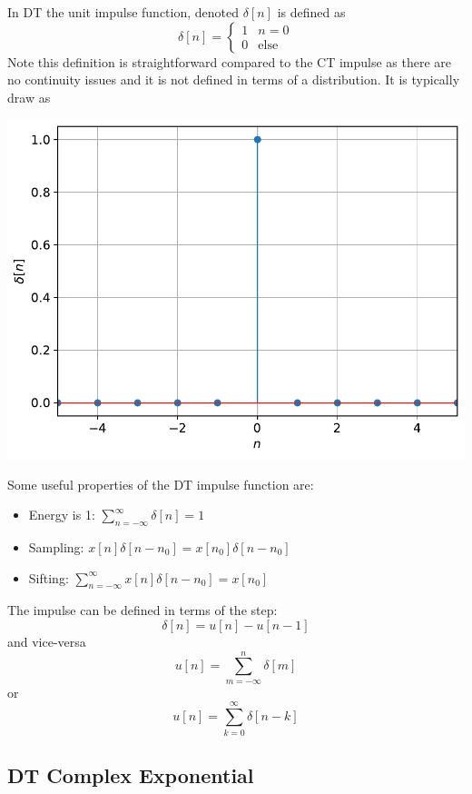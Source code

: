 In DT the unit impulse function, denoted $\delta[n]$ is defined as
\[
\delta[n] = \left\{
\begin{array}{ll}
  1 & n = 0\\
  0 & \text{else}
\end{array}
\right.
\]
Note this definition is straightforward compared to the CT impulse as there are no continuity issues and it is not defined in terms of a distribution. It is typically draw as
\begin{center}
  \includegraphics[scale=0.5]{graphics/dtdelta.pdf}
\end{center}

Some useful properties of the DT impulse function are:

\begin{itemize}
\item Energy is 1: $\sum\limits_{n=-\infty}^{\infty} \delta[n] = 1$
\item Sampling: $x[n]\delta[n-n_0] = x[n_0]\delta[n-n_0]$
\item Sifting: $\sum\limits_{n=-\infty}^{\infty} x[n]\delta[n-n_0] = x[n_0]$
\end{itemize}

The impulse can be defined in terms of the step:
\[
\delta[n] = u[n] - u[n-1]
\]
and vice-versa
\[
u[n] = \sum\limits_{m=-\infty}^{n} \delta[m]
\]
or
\[
u[n] = \sum\limits_{k=0}^{\infty} \delta[n-k]
\]

\subsection{DT Complex Exponential}

